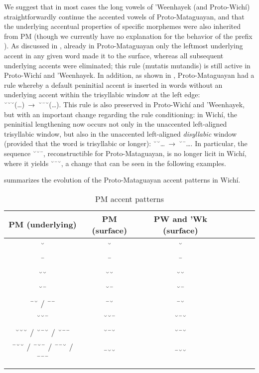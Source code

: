 We suggest that in most cases the long vowels of 'Weenhayek (and Proto-Wichí) straightforwardly continue the accented vowels of Proto-Mataguayan, and that the underlying accentual properties of specific morphemes were also inherited from PM (though we currently have no explanation for the behavior of the prefix ). As discussed in , already in Proto-Mataguayan only the leftmost underlying accent in any given word made it to the surface, whereas all subsequent underlying accents were eliminated; this rule (mutatis mutandis) is still active in Proto-Wichí and 'Weenhayek. In addition, as shown in , Proto-Mataguayan had a rule whereby a default peninitial accent is inserted in words without an underlying accent within the trisyllabic window at the left edge: ˘˘˘(…)~→~˘¯˘(…). This rule is also preserved in Proto-Wichí and ’Weenhayek, but with an important change regarding the rule conditioning: in Wichí, the peninitial lengthening now occurs not only in the unaccented left-aligned trisyllabic window, but also in the unaccented left-aligned \emph{disyllabic} window (provided that the word is trisyllabic or longer): ˘˘…~→~˘¯…. In particular, the sequence ˘˘¯, reconstructible for Proto-Mataguayan, is no longer licit in Wichí, where it yields ˘¯˘, a change that can be seen in the following examples.

\begin{exe}
    \ex \shoulder
    \ex \elbow
    \ex \elderbro
    \ex \eldersis
    \ex \cheek
    \ex \lidpl
    \ex \leg
    \ex \starnpl
    \ex \basetrunkpl
\end{exe}

 summarizes the evolution of the Proto-Mataguayan accent patterns in Wichí.

\begin{table}
\caption{PM accent patterns}
\label{PM-accent-patterns-Wi}
 \begin{tabular}{ccccccc}
  \lsptoprule
           PM (underlying) & PM (surface) & PW and 'Wk (surface)\\\midrule
  ˘ & ˘ & ˘\\
  ¯ & ¯ & ¯\\
  ˘˘ & ˘˘ & ˘˘\\
  ˘¯ & ˘¯ & ˘¯\\
  ¯˘ / ¯¯ & ¯˘ & ¯˘\\
  ˘˘¯ & ˘˘¯ & ˘¯˘\\
  ˘˘˘ / ˘¯˘ / ˘¯¯ & ˘¯˘ & ˘¯˘\\
  ¯˘˘ / ¯˘¯ / ¯¯˘ / ¯¯¯ & ¯˘˘ & ¯˘˘\\
  \lspbottomrule
 \end{tabular}
\end{table}

